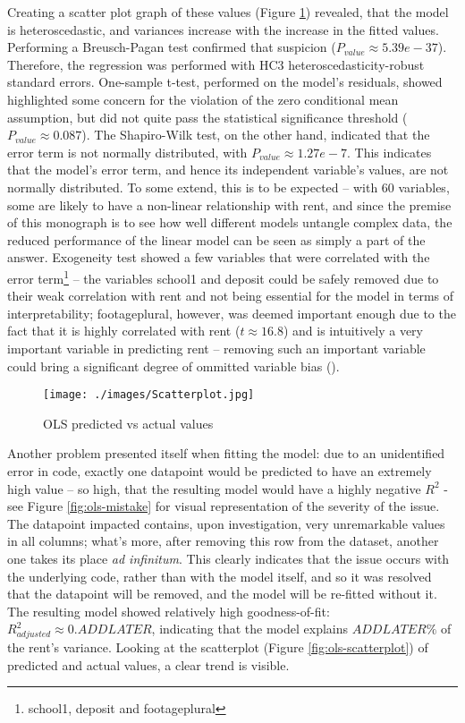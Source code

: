 \documentclass[12pt]{report}
\begin{document}
Creating a scatter plot graph of these values (Figure \ref{fig:heteroscedasticity}) revealed, that the model is heteroscedastic, and variances increase with the increase in the fitted values. Performing a Breusch-Pagan test confirmed that suspicion ($P_{value}\approx5.39e-37$). Therefore, the regression was performed with HC3 heteroscedasticity-robust standard errors. One-sample t-test, performed on the model's residuals, showed highlighted some concern for the violation of the zero conditional mean assumption, but did not quite pass the statistical significance threshold ($P_{value}\approx0.087$). The Shapiro-Wilk test, on the other hand, indicated that the error term is not normally distributed, with $P_{value}\approx1.27e-7$. This indicates that the model's error term, and hence its independent variable's values, are not normally distributed. To some extend, this is to be expected -- with 60 variables, some are likely to have a non-linear relationship with rent, and since the premise of this monograph is to see how well different models untangle complex data, the reduced performance of the linear model can be seen as simply a part of the answer. Exogeneity test showed a few variables that were correlated with the error term\footnote{school1, deposit and footageplural} -- the variables school1 and deposit could be safely removed due to their weak correlation with rent and not being essential for the model in terms of interpretability; footageplural, however, was deemed important enough due to the fact that it is highly correlated with rent ($t\approx16.8$) and is intuitively a very important variable in predicting rent -- removing such an important variable could bring a significant degree of ommitted variable bias (\cite{walsch2021}).

\begin{figure}[h]
	\centering
	\texttt{[image: ./images/Scatterplot.jpg]}
	\caption{OLS predicted vs actual values}
	\label{fig:heteroscedasticity}
\end{figure}

Another problem presented itself when fitting the model: due to an unidentified error in code, exactly one datapoint would be predicted to have an extremely high value -- so high, that the resulting model would have a highly negative $R^2$ - see Figure \ref{fig:ols-mistake} for visual representation of the severity of the issue. The datapoint impacted contains, upon investigation, very unremarkable values in all columns; what's more, after removing this row from the dataset, another one takes its place \textit{ad infinitum}. This clearly indicates that the issue occurs with the underlying code, rather than with the model itself, and so it was resolved that the datapoint will be removed, and the model will be re-fitted without it. The resulting model showed relatively high goodness-of-fit: $R_{adjusted}^2\approx0.ADDLATER$, indicating that the model explains $ADDLATER\%$ of the rent's variance. Looking at the scatterplot (Figure \ref{fig:ols-scatterplot}) of predicted and actual values, a clear trend is visible.
\end{document}
